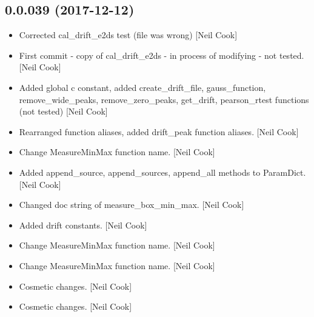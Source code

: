 \documentclass[a4paper,10pt,english]{report}
\begin{document}
\subsection{0.0.039 (2017-12-12)}
\label{\detokenize{misc/changelog:id511}}\begin{itemize}
\item {} 
Corrected cal\_drift\_e2ds test (file was wrong) {[}Neil Cook{]}

\item {} 
First commit - copy of cal\_drift\_e2ds - in process of modifying - not
tested. {[}Neil Cook{]}

\item {} 
Added global c constant, added create\_drift\_file, gauss\_function,
remove\_wide\_peaks, remove\_zero\_peaks, get\_drift, pearson\_rtest
functions (not tested) {[}Neil Cook{]}

\item {} 
Rearranged function aliases, added drift\_peak function aliases. {[}Neil
Cook{]}

\item {} 
Change MeasureMinMax function name. {[}Neil Cook{]}

\item {} 
Added append\_source, append\_sources, append\_all methods to ParamDict.
{[}Neil Cook{]}

\item {} 
Changed doc string of measure\_box\_min\_max. {[}Neil Cook{]}

\item {} 
Added drift constants. {[}Neil Cook{]}

\item {} 
Change MeasureMinMax function name. {[}Neil Cook{]}

\item {} 
Change MeasureMinMax function name. {[}Neil Cook{]}

\item {} 
Cosmetic changes. {[}Neil Cook{]}

\item {} 
Cosmetic changes. {[}Neil Cook{]}

\end{itemize}
\end{document}
